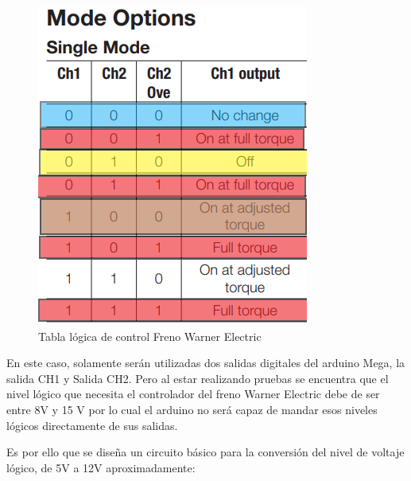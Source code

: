 \documentclass[12pt,titlepage]{article}
\begin{document}
\begin{figure}[htbp]
\hspace*{5.2cm} 
\includegraphics[scale=0.60]{modos_freno}
\caption{Tabla lógica de control Freno Warner Electric}
\end{figure}

En este caso, solamente serán utilizadas dos salidas digitales del arduino Mega, la salida CH1 y Salida CH2. 
Pero al estar realizando pruebas se encuentra que el nivel lógico que necesita el controlador del freno Warner Electric debe de ser entre 8V y 15 V por lo cual el arduino no será capaz de mandar esos niveles lógicos directamente de sus salidas. 

Es por ello que se diseña un circuito básico para la conversión del nivel de voltaje lógico, de 5V a 12V aproximadamente: \\ 
\end{document}
